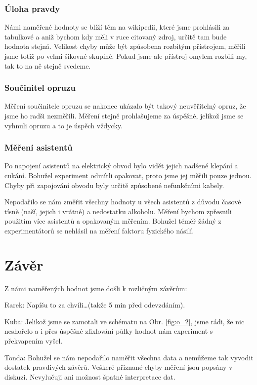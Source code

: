 \documentclass[english]{article}
\begin{document}
\subsubsection{Úloha pravdy}
Námi naměřené hodnoty se blíží těm na wikipedii, které jsme prohlásili za tabulkové a aniž bychom kdy měli v ruce citovaný zdroj, určitě tam bude hodnota stejná. Velikost chyby může být způsobena rozbitým přístrojem, měřili jsme totiž po velmi šikovné skupině. Pokud jsme ale přístroj omylem rozbili my, tak to na ně stejně svedeme. 

\subsubsection{Součinitel opruzu}
Měření součinitele opruzu se nakonec ukázalo být takový neuvěřitelný opruz, že jsme ho radši nezměřili. Měření stejně prohlašujeme za úspěšné, jelikož jsme se vyhnuli opruzu a to je úspěch vždycky.

\subsubsection{Měření asistentů}
Po napojení asistentů na elektrický obvod bylo vidět jejich nadšené klepání a cukání. Bohužel experiment odmítli opakovat, proto jsme jej měřili pouze jednou. Chyby při zapojování obvodu byly určitě způsobené nefunkčními kabely.

Nepodařilo se nám změřit všechny hodnoty u všech asistentů z důvodu časové tísně (naší, jejich i vrátné) a nedostatku alkoholu. Měření bychom zpřesnili použitím více asistentů a opakovaným měřením. Bohužel téměř žádný z experimentátorů se nehlásil na měření faktoru fyzického násilí.
\section{Závěr}
Z námi naměřených hodnot jsme došli k rozličným závěrům:

{\color{rarek}Rarek}: Napíšu to za chvíli…(takže 5 min před odevzdáním).

{\color{kuba}Kuba}: Jelikož jsme se zamotali ve schématu na Obr. \ref{fig:o_2}, jsme rádi, že nic neshořelo a i přes úspěšné zfixlování půlky hodnot nám experiment s překvapením vyšel.

{\color{tonda}Tonda}: Bohužel se nám nepodařilo naměřit všechna data a nemůžeme tak vyvodit dostatek pravdivých závěrů. Veškeré přiznané chyby měření jsou popsány v diskuzi. Nevylučuji ani možnost špatné interpretace dat.
\end{document}
